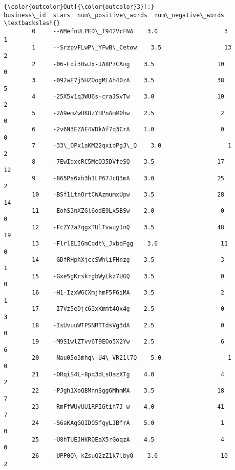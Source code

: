 \documentclass[11pt]{article}
\begin{document}
\begin{Verbatim}[commandchars=\\\{\}]
{\color{outcolor}Out[{\color{outcolor}3}]:}                  business\_id  stars  num\_positive\_words  num\_negative\_words  \textbackslash{}
        0     --6MefnULPED\_I942VcFNA    3.0                   3                   1   
        1     --SrzpvFLwP\_YFwB\_Cetow    3.5                  13                   2   
        2     -06-Fdi30wJx-JA8P7CAng    3.5                  10                   0   
        3     -092wE7j5HZOogMLAh40zA    3.5                  38                   5   
        4     -25X5v1q3WU6s-craJSvTw    3.0                  10                   2   
        5     -2A9emZwBK8zYHPnAmM0hw    2.5                   2                   0   
        6     -2v6N3EZAE4VDkAf7q3CrA    1.0                   0                   0   
        7     -33\_OPx1aKM22qxioPgJ\_Q    3.0                   1                   2   
        8     -7EwIdxcRC5McO35DVfeSQ    3.5                  17                  12   
        9     -865Ps6xb3h1LP67JcQ3mA    3.0                  25                   2   
        10    -BSf1LtnOrtCWAzmumxUpw    3.5                  28                  14   
        11    -EohS3nXZGl6odE9Lx5BSw    2.0                   0                   0   
        12    -FcZY7a7qgxTUlTvwuyJnQ    3.5                  48                  19   
        13    -FlrlELIGmCqdt\_JxbdFgg    3.0                  11                   0   
        14    -GDfRHphXjccSWhliFHnzg    3.5                   3                   1   
        15    -Gxe5gKrskrgbWyLkz7UGQ    3.5                   0                   0   
        16    -H1-IzxW6CXmjhmF5F6iMA    3.5                   2                   1   
        17    -I7Vz5eDjc63xKmmt4Qx4g    2.5                   0                   3   
        18    -IsUvuuWTPSNRTTdsVg3dA    2.5                   0                   0   
        19    -M9S1wlZTvv6T9EOo5X2Yw    2.5                   6                   6   
        20    -Nau05o3mhq\_U4\_VR21l7Q    5.0                   1                   0   
        21    -ORqiS4L-8pq3dLsUazXTg    4.0                   4                   2   
        22    -PJgh1XoQBMnnSgg6MhmMA    3.5                  18                   7   
        23    -RmFfWUyUU1RPIGtih7J-w    4.0                  41                   7   
        24    -S6aKAgGQID05fgyLJBfrA    5.0                   1                   0   
        25    -U8hTUEJHKROEaX5rGoqzA    4.5                   4                   0   
        26    -UPP0Q\_kZsuQ2zZ1k7lbyQ    3.0                  10                   2   

\end{Verbatim}
\end{document}
